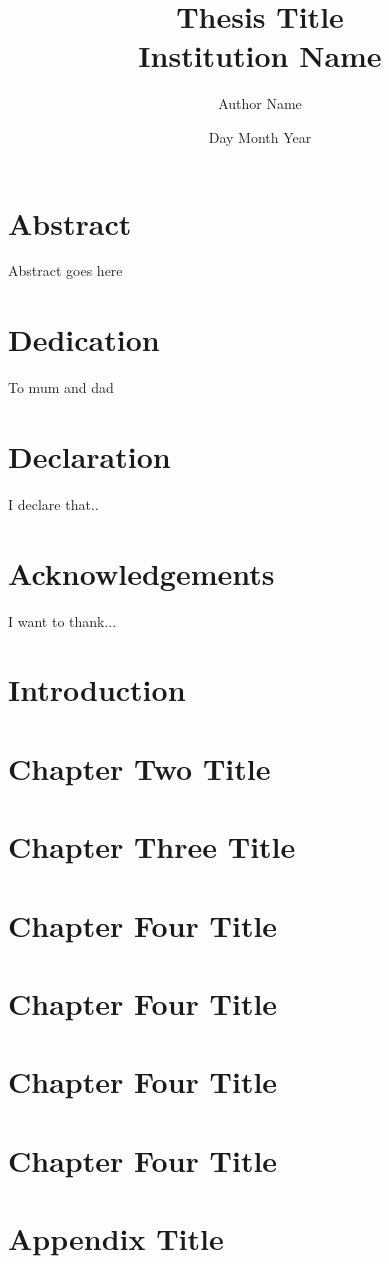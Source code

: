 \documentclass[12pt]{report}
\begin{document}
\title{
	{Thesis Title}\\
	{\large Institution Name}\\
}
\author{Author Name}
\date{Day Month Year}

\maketitle

\chapter*{Abstract}
Abstract goes here

\chapter*{Dedication}
To mum and dad

\chapter*{Declaration}
I declare that..

\chapter*{Acknowledgements}
I want to thank...

\tableofcontents

\chapter{Introduction}


\chapter{Chapter Two Title}


\chapter{Chapter Three Title}


\chapter{Chapter Four Title}


\chapter{Chapter Four Title}


\chapter{Chapter Four Title}


\chapter{Chapter Four Title}



\appendix
\chapter{Appendix Title}
%
\end{document}
